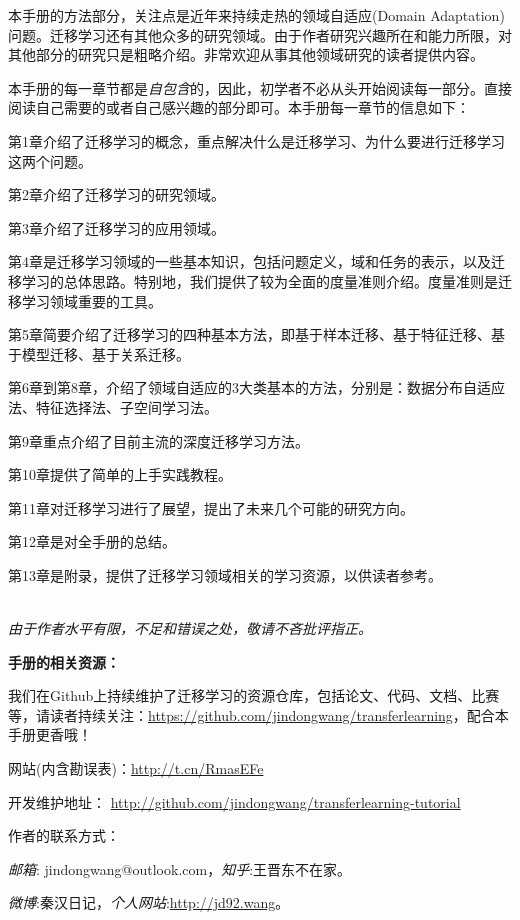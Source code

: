 本手册的方法部分，关注点是近年来持续走热的领域自适应(Domain Adaptation)问题。迁移学习还有其他众多的研究领域。由于作者研究兴趣所在和能力所限，对其他部分的研究只是粗略介绍。非常欢迎从事其他领域研究的读者提供内容。

本手册的每一章节都是\textit{自包含}的，因此，初学者不必从头开始阅读每一部分。直接阅读自己需要的或者自己感兴趣的部分即可。本手册每一章节的信息如下：

第1章介绍了迁移学习的概念，重点解决什么是迁移学习、为什么要进行迁移学习这两个问题。

第2章介绍了迁移学习的研究领域。

第3章介绍了迁移学习的应用领域。

第4章是迁移学习领域的一些基本知识，包括问题定义，域和任务的表示，以及迁移学习的总体思路。特别地，我们提供了较为全面的度量准则介绍。度量准则是迁移学习领域重要的工具。

第5章简要介绍了迁移学习的四种基本方法，即基于样本迁移、基于特征迁移、基于模型迁移、基于关系迁移。

第6章到第8章，介绍了领域自适应的3大类基本的方法，分别是：数据分布自适应法、特征选择法、子空间学习法。

第9章重点介绍了目前主流的深度迁移学习方法。

第10章提供了简单的上手实践教程。

第11章对迁移学习进行了展望，提出了未来几个可能的研究方向。

第12章是对全手册的总结。

第13章是附录，提供了迁移学习领域相关的学习资源，以供读者参考。

\textit{\\由于作者水平有限，不足和错误之处，敬请不吝批评指正。}

\textbf{手册的相关资源：}

我们在Github上持续维护了迁移学习的资源仓库，包括论文、代码、文档、比赛等，请读者持续关注：\url{https://github.com/jindongwang/transferlearning}，配合本手册更香哦！

网站(内含勘误表)：\url{http://t.cn/RmasEFe}

开发维护地址： \url{http://github.com/jindongwang/transferlearning-tutorial}

作者的联系方式：

\textit{邮箱}: {\ttfamily jindongwang@outlook.com}，\textit{知乎}:{\ttfamily 王晋东不在家}。

\textit{微博}:{\ttfamily 秦汉日记}，\textit{个人网站}:\url{http://jd92.wang}。
